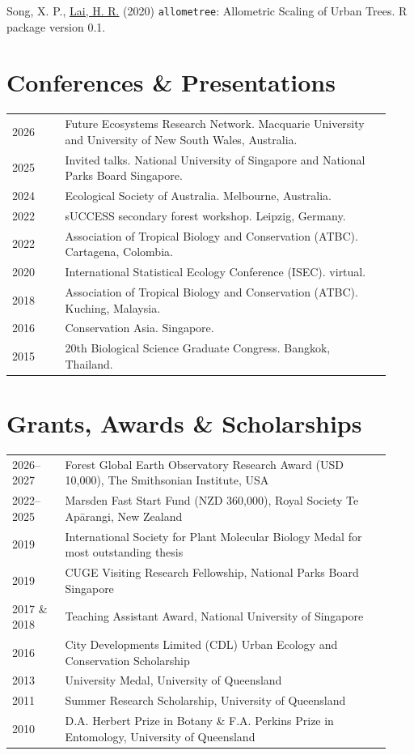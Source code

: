 \documentclass[a4paper]{article}
\begin{document}
\hangindent=1cm Song, X. P., \underline{Lai, H. R.} (2020) \texttt{allometree}: Allometric Scaling of Urban Trees. R package version 0.1.

\section*{Conferences \& Presentations}
\begin{tabular}{p{0.13\linewidth} p{0.8\linewidth}}
2026 & Future Ecosystems Research Network. Macquarie University and University of New South Wales, Australia. \\
2025 & Invited talks. National University of Singapore and National Parks Board Singapore. \\
2024 & Ecological Society of Australia. Melbourne, Australia. \\
2022 & sUCCESS secondary forest workshop. Leipzig, Germany. \\
2022 & Association of Tropical Biology and Conservation (ATBC). Cartagena, Colombia. \\
2020 & International Statistical Ecology Conference (ISEC). virtual. \\
2018 & Association of Tropical Biology and Conservation (ATBC). Kuching, Malaysia. \\
2016 & Conservation Asia. Singapore. \\
2015 & 20th Biological Science Graduate Congress. Bangkok, Thailand. \\
\end{tabular}


\section*{Grants, Awards \& Scholarships}
\begin{tabular}{p{0.13\linewidth} p{0.8\linewidth}}
2026--2027 & Forest Global Earth Observatory Research Award (USD 10,000), The Smithsonian Institute, USA \\
2022--2025 & Marsden Fast Start Fund (NZD 360,000), Royal Society Te Ap\=arangi, New Zealand \\
2019 & International Society for Plant Molecular Biology Medal for most outstanding thesis \\
2019 & CUGE Visiting Research Fellowship, National Parks Board Singapore \\
2017 \& 2018 & Teaching Assistant Award, National University of Singapore \\
2016 & City Developments Limited (CDL) Urban Ecology and Conservation Scholarship \\
2013 & University Medal, University of Queensland \\
2011 & Summer Research Scholarship, University of Queensland \\
2010 & D.A. Herbert Prize in Botany \& F.A. Perkins Prize in Entomology, University of Queensland 
\end{tabular}
\end{document}
